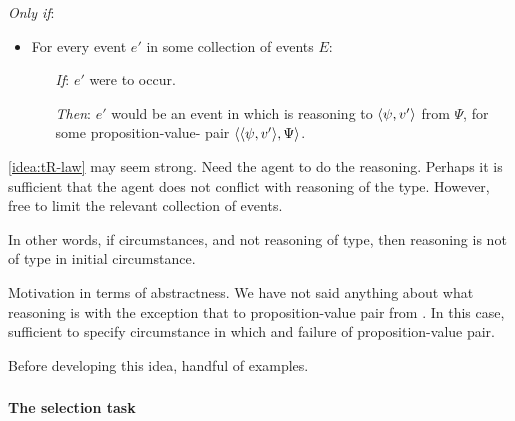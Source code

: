 \begin{note}
\begin{idea}
    \emph{Only if}:

    \begin{itemize}
    \item
      For every event \(e'\) in some collection of events \(E\):
      \begin{itemize}
      \item[\emph{If}:]
        \(e'\) were to occur.
      \item[\emph{Then}:]
        \(e'\) would be an event in which \vAgent{} is reasoning to \(\langle \psi, v' \rangle\) from \(\Psi\), for some proposition-value-\pool{} pair \(\langle \langle \psi, v' \rangle, \Psi \rangle\).
      \end{itemize}
    \end{itemize}
  \end{idea}

  \autoref{idea:tR-law} may seem strong.
  Need the agent to do the reasoning.
  Perhaps it is sufficient that the agent does not conflict with reasoning of the type.
  However, free to limit the relevant collection of events.

  In other words, if circumstances, and not reasoning of type, then reasoning is not of type in initial circumstance.

  Motivation in terms of abstractness.
  We have not said anything about what reasoning is with the exception that to proposition-value pair from \pool{}.
  In this case, sufficient to specify circumstance in which \pool{} and failure of proposition-value pair.

  Before developing this idea, handful of examples.
\end{note}

\subsubsection{}
\label{sec:illu3-1}

\paragraph{The selection task}
\nocite{Wason:1968aa}
\nocite{wason1971natural}

